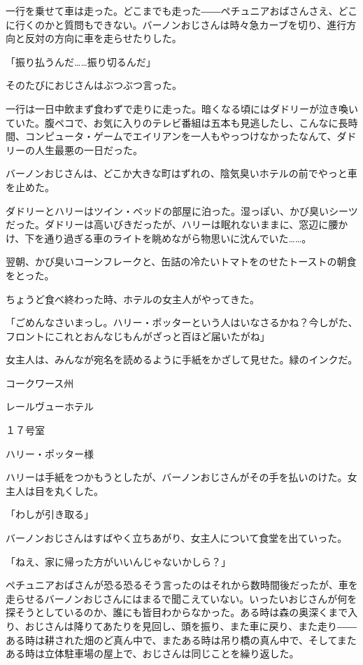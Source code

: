 \documentclass[10pt,a4paper]{article}
\begin{document}
\begin{CJK}{UTF8}{min}
一行を乗せて車は走った。どこまでも走った――ペチュニアおばさんさえ、どこに行くのかと質問もできない。バーノンおじさんは時々急カーブを切り、進行方向と反対の方向に車を走らせたりした。

「振り払うんだ……振り切るんだ」

そのたびにおじさんはぶつぶつ言った。

一行は一日中飲まず食わずで走りに走った。暗くなる頃にはダドリーが泣き喚いていた。腹ペコで、お気に入りのテレビ番組は五本も見逃したし、こんなに長時間、コンピュータ・ゲームでエイリアンを一人もやっつけなかったなんて、ダドリーの人生最悪の一日だった。

バーノンおじさんは、どこか大きな町はずれの、陰気臭いホテルの前でやっと車を止めた。

ダドリーとハリーはツイン・ベッドの部屋に泊った。湿っぽい、かび臭いシーツだった。ダドリーは高いびきだったが、ハリーは眠れないままに、窓辺に腰かけ、下を通り過ぎる車のライトを眺めながら物思いに沈んでいた……。



翌朝、かび臭いコーンフレークと、缶詰の冷たいトマトをのせたトーストの朝食をとった。

ちょうど食べ終わった時、ホテルの女主人がやってきた。

「ごめんなさいまっし。ハリー・ポッターという人はいなさるかね？今しがた、フロントにこれとおんなじもんがざっと百ほど届いたがね」

女主人は、みんなが宛名を読めるように手紙をかざして見せた。緑のインクだ。



コークワース州

レールヴューホテル

１７号室

ハリー・ポッター様



ハリーは手紙をつかもうとしたが、バーノンおじさんがその手を払いのけた。女主人は目を丸くした。

「わしが引き取る」

バーノンおじさんはすばやく立ちあがり、女主人について食堂を出ていった。



「ねえ、家に帰った方がいいんじゃないかしら？」

ペチュニアおばさんが恐る恐るそう言ったのはそれから数時間後だったが、車を走らせるバーノンおじさんにはまるで聞こえていない。いったいおじさんが何を探そうとしているのか、誰にも皆目わからなかった。ある時は森の奥深くまで入り、おじさんは降りてあたりを見回し、頭を振り、また車に戻り、また走り――ある時は耕された畑のど真ん中で、またある時は吊り橋の真ん中で、そしてまたある時は立体駐車場の屋上で、おじさんは同じことを繰り返した。


\end{CJK}
\end{document}
